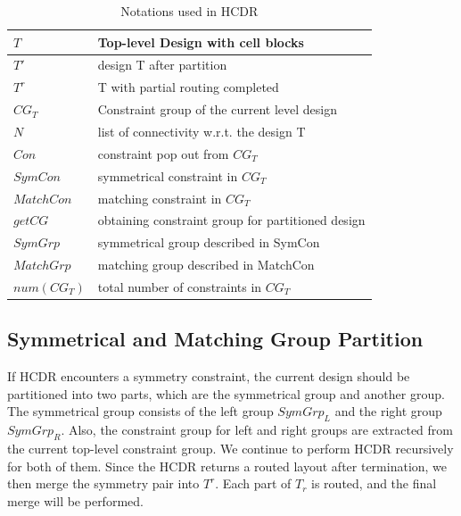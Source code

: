       \begin{table}[ht]
        \centering
        \caption{Notations used in HCDR}\label{tableNotation}
        \begin{scriptsize}
        \begin{tabular}[t]{|l|l|}
          \hline
          $T$       & Top-level Design with cell blocks \\
          \hline
          $T'$      &   design T after partition      \\
          \hline
          $T^r$       &   T with partial routing completed  \\
          \hline
          $CG_T$      & Constraint group of the current level design  \\
          \hline
          $N$       & list of connectivity w.r.t. the design T  \\
          \hline
          $Con  $   & constraint pop out from $CG_T$    \\
          \hline
          $SymCon$    & symmetrical constraint in $CG_T$  \\
          \hline
          $MatchCon$    & matching constraint in $CG_T$   \\
          \hline
          $getCG$     & obtaining constraint group for partitioned design \\
          \hline
          $SymGrp$    & symmetrical group described in SymCon \\
          \hline
          $MatchGrp$    & matching group described in MatchCon  \\
          \hline
          $num(CG_T)$   & total number of constraints in $CG_T$ \\
          \hline
        \end{tabular}
        \end{scriptsize}
      \end{table}


    \subsection{Symmetrical and Matching Group Partition}\label{sec:SMGrp}
      
      If HCDR encounters a symmetry constraint, the current design should be partitioned into two parts, which are the symmetrical group and another group. The symmetrical group consists of the left group $SymGrp_L $ and the right group $SymGrp_R$. Also, the constraint group for left and right groups are extracted from the current top-level constraint group. We continue to perform HCDR recursively for both of them. Since the HCDR returns a routed layout after termination, we then merge the symmetry pair into $T^r$. Each part of $T_r$ is routed, and the final merge will be performed. 

